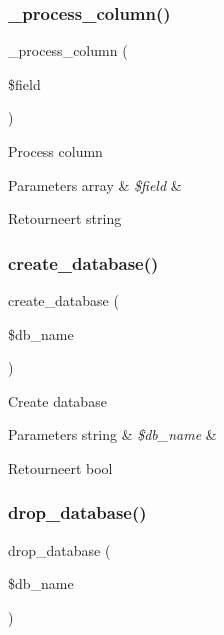 \subsubsection{\texorpdfstring{\_process\_column()}{\_process\_column()}}
{\footnotesize\ttfamily \+\_\+process\+\_\+column (\begin{DoxyParamCaption}\item[{}]{\$field }\end{DoxyParamCaption})\hspace{0.3cm}{\ttfamily [protected]}}

Process column


\begin{DoxyParams}[1]{Parameters}
array & {\em \$field} & \\
\hline
\end{DoxyParams}
\begin{DoxyReturn}{Retourneert}
string 
\end{DoxyReturn}
\mbox{\label{class_c_i___d_b__sqlite3__forge_a902a7267babceb2ce595706f217e00ad}} 
\subsubsection{\texorpdfstring{create\_database()}{create\_database()}}
{\footnotesize\ttfamily create\+\_\+database (\begin{DoxyParamCaption}\item[{}]{\$db\+\_\+name }\end{DoxyParamCaption})}

Create database


\begin{DoxyParams}[1]{Parameters}
string & {\em \$db\+\_\+name} & \\
\hline
\end{DoxyParams}
\begin{DoxyReturn}{Retourneert}
bool 
\end{DoxyReturn}
\mbox{\label{class_c_i___d_b__sqlite3__forge_a9612987b2d4230de2638d15857e92e67}} 
\subsubsection{\texorpdfstring{drop\_database()}{drop\_database()}}
{\footnotesize\ttfamily drop\+\_\+database (\begin{DoxyParamCaption}\item[{}]{\$db\+\_\+name }\end{DoxyParamCaption})}

